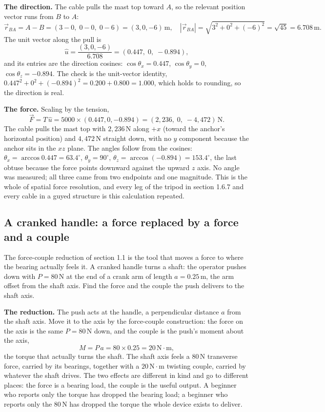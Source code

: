 \textbf{The direction.} The cable pulls the mast top toward $A$, so the
relevant position vector runs from $B$ to $A$:
\[
\vec{r}_{BA} = A - B = (3 - 0,\; 0 - 0,\; 0 - 6) = (3, 0, -6)\,\si{\meter},
\quad
|\vec{r}_{BA}| = \sqrt{3^2 + 0^2 + (-6)^2} = \sqrt{45} = 6.708\,\si{\meter}.
\]
The unit vector along the pull is
\[
\hat{u} = \frac{(3, 0, -6)}{6.708} = (0.447,\; 0,\; -0.894),
\]
and its entries are the direction cosines: $\cos\theta_x = 0.447$,
$\cos\theta_y = 0$, $\cos\theta_z = -0.894$. The check is the unit-vector
identity, $0.447^2 + 0^2 + (-0.894)^2 = 0.200 + 0.800 = 1.000$, which holds
to rounding, so the direction is real.

\textbf{The force.} Scaling by the tension,
\[
\vec{F} = T\,\hat{u} = 5000 \times (0.447, 0, -0.894)
= (2{,}236,\; 0,\; -4{,}472)\,\text{N}.
\]
The cable pulls the mast top with $2{,}236\,\text{N}$ along $+x$ (toward the
anchor's horizontal position) and $4{,}472\,\text{N}$ straight down, with no
$y$ component because the anchor sits in the $xz$ plane. The angles follow
from the cosines: $\theta_x = \arccos 0.447 = 63.4^{\circ}$, $\theta_y =
90^{\circ}$, $\theta_z = \arccos(-0.894) = 153.4^{\circ}$, the last obtuse
because the force points downward against the upward $z$ axis. No angle was
measured; all three came from two endpoints and one magnitude. This is the
whole of spatial force resolution, and every leg of the tripod in section
1.6.7 and every cable in a guyed structure is this calculation repeated.

\subsection{A cranked handle: a force replaced by a force and a couple}

The force-couple reduction of section 1.1 is the tool that moves a force to
where the bearing actually feels it. A cranked handle turns a shaft: the
operator pushes down with $P = 80\,\text{N}$ at the end of a crank arm of
length $a = 0.25\,\si{\meter}$, the arm offset from the shaft axis. Find
the force and the couple the push delivers to the shaft axis.

\textbf{The reduction.} The push acts at the handle, a perpendicular
distance $a$ from the shaft axis. Move it to the axis by the force-couple
construction: the force on the axis is the same $P = 80\,\text{N}$ down,
and the couple is the push's moment about the axis,
\[
M = P\,a = 80 \times 0.25 = 20\,\text{N}\cdot\text{m},
\]
the torque that actually turns the shaft. The shaft axis feels a
$80\,\text{N}$ transverse force, carried by its bearings, together with a
$20\,\text{N}\cdot\text{m}$ twisting couple, carried by whatever the shaft
drives. The two effects are different in kind and go to different places:
the force is a bearing load, the couple is the useful output. A beginner
who reports only the torque has dropped the bearing load; a beginner who
reports only the $80\,\text{N}$ has dropped the torque the whole device
exists to deliver.

